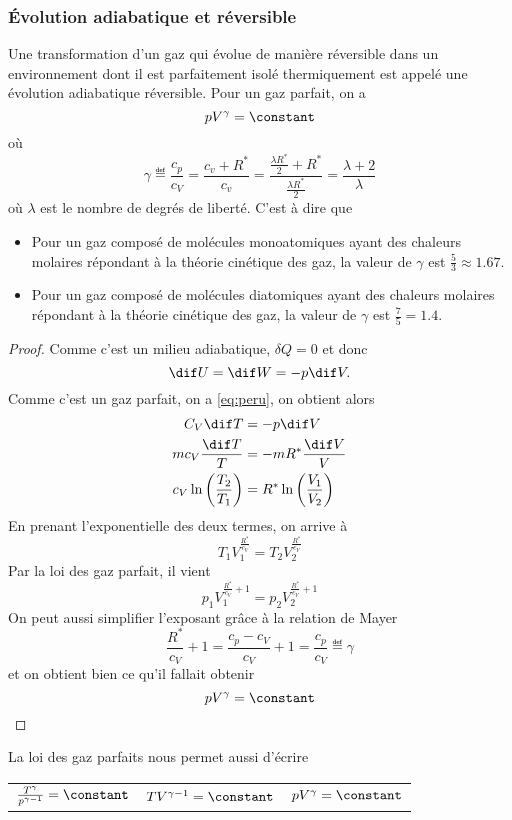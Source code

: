 \subsubsection{Évolution adiabatique et réversible}
Une transformation d'un gaz qui évolue de manière réversible dans
un environnement dont il est parfaitement isolé thermiquement est
appelé une évolution adiabatique réversible.
Pour un gaz parfait, on a
\[ pV^{\gamma} = \constant \]
où
\[ \gamma \eqdef \frac{c_p}{c_V} = \frac{c_v+R^*}{c_v}
  = \frac{\frac{\lambda R^*}{2}+R^*}{\frac{\lambda R^*}{2}}
  = \frac{\lambda + 2}{\lambda} \]
où $\lambda$ est le nombre de degrés de liberté.
C'est à dire que
\begin{itemize}
  \item Pour un gaz composé de molécules monoatomiques
    ayant des chaleurs molaires répondant à la théorie cinétique des gaz,
    la valeur de $\gamma$ est $\frac{5}{3} \approx \si{1.67}{}$.
  \item Pour un gaz composé de molécules diatomiques
    ayant des chaleurs molaires répondant à la théorie cinétique des gaz,
    la valeur de $\gamma$ est $\frac{7}{5} = \si{1.4}{}$.
\end{itemize}
\begin{proof}
  Comme c'est un milieu adiabatique, $\delta Q = 0$ et donc
  \[ \dif U = \dif W = -p\dif V. \]
  Comme c'est un gaz parfait, on a \eqref{eq:peru}, on obtient alors
  \begin{align*}
    C_V \dif T & = -p \dif V\\
    mc_{V}\frac{\dif T}{T} & = -mR^*\frac{\dif V}{V}\\
    c_{V} \ln\left(\frac{T_2}{T_1}\right) & =
    R^* \ln\left(\frac{V_1}{V_2}\right)
  \end{align*}
  En prenant l'exponentielle des deux termes, on arrive à
  \[ T_1V_1^{\frac{R^*}{c_{V}}} = T_2V_2^{\frac{R^*}{c_{V}}} \]
  Par la loi des gaz parfait, il vient
  \[ p_1V_1^{\frac{R^*}{c_{V}}+1} = p_2V_2^{\frac{R^*}{c_{V}}+1} \]
  On peut aussi simplifier l'exposant grâce à la relation de Mayer
  \[ \frac{R^*}{c_{V}}+1 = \frac{c_{p}-c_{V}}{c_{V}}+1 =
  \frac{c_{p}}{c_{V}} \eqdef \gamma \]
  et on obtient bien ce qu'il fallait obtenir
  \[ pV^{\gamma} = \constant \]
\end{proof}
La loi des gaz parfaits nous permet aussi d'écrire
\begin{center}
  \begin{tabular}{p{}p{}p{}}
    \centering$\frac{T^\gamma}{p^{\gamma-1}} = \constant$ &
    \centering$TV^{\gamma-1} = \constant$ &
    \centering$pV^\gamma = \constant$
  \end{tabular}
\end{center}

